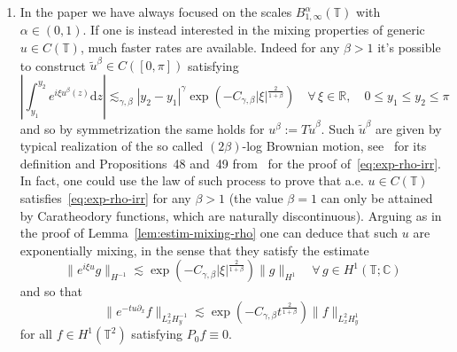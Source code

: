 \documentclass[11pt,oneside,reqno]{amsart}
\newcommand{\assign}{:=}
\newcommand{\mathd}{\mathrm{d}}
\newenvironment{enumeratenumeric}{\begin{enumerate}[1.] }{\end{enumerate}}
\numberwithin{equation}{section}
\begin{document}
\begin{enumeratenumeric}
  \item In the paper we have always focused on the scales $B^{\alpha}_{1,
  \infty} (\mathbb{T})$ with $\alpha \in (0, 1)$. If one is instead interested
  in the mixing properties of generic $u \in C (\mathbb{T})$, much faster
  rates are available. Indeed for any $\beta > 1$ it's possible to construct
  $\tilde{u}^{\beta} \in C ([0, \pi])$ satisfying
  \begin{equation}
    \left| \int_{y_1}^{y_2} e^{i \xi u^{\beta} (z)} \mathd z \right|
    \lesssim_{\gamma, \beta} | y_2 - y_1 |^{\gamma} \exp \left( - C_{\gamma,
    \beta}  | \xi |^{\frac{2}{1 + \beta}} \right) \quad \forall \, \xi \in
    \mathbb{R}, \quad 0 \leqslant y_1 \leqslant y_2 \leqslant \pi
    \label{eq:exp-rho-irr}
  \end{equation}
  and so by symmetrization the same holds for $u^{\beta} \assign T
  \tilde{u}^{\beta}$. Such $\tilde{u}^{\beta}$ are given by typical
  realization of the so called $(2 \beta)$-log Brownian motion,
  see~{\cite{perkowski}} for its definition and Propositions~48 and~49
  from~{\cite{galeati2020prevalence}} for the proof of~\eqref{eq:exp-rho-irr}.
  In fact, one could use the law of such process to prove that a.e. $u \in C
  (\mathbb{T})$ satisfies~\eqref{eq:exp-rho-irr} for any $\beta > 1$ (the
  value $\beta = 1$ can only be attained by Caratheodory functions, which are
  naturally discontinuous). Arguing as in the proof of
  Lemma~\ref{lem:estim-mixing-rho} one can deduce that such $u$ are
  exponentially mixing, in the sense that they satisfy the estimate
  \begin{equation*}
    \| e^{i \xi u} g \|_{H^{- 1}} \lesssim \exp \left( - C_{\gamma, \beta}  |
    \xi |^{\frac{2}{1 + \beta}} \right)  \| g \|_{H^1} \quad \forall \, g \in
    H^1 (\mathbb{T}; \mathbb{C})
  \end{equation*}
  and so that
  \begin{equation*}
    \| e^{- t u \partial_x} f \|_{L^2_x H^{- 1}_y} \lesssim \exp \left( -
    C_{\gamma, \beta} t^{\frac{2}{1 + \beta}} \right) \| f \|_{L^2_x H^1_y}
  \end{equation*}
  for all $f \in H^1 (\mathbb{T}^2)$ satisfying $P_0 f \equiv 0$.
  

\end{enumeratenumeric}
\end{document}
